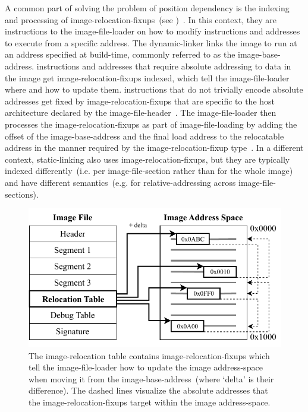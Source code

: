 A common part of solving the problem of position dependency is the indexing and processing of \glspl{image-relocation-fixup}~(see )~\cite{levine2000linkers}. In this context, they are instructions to the \gls{image-file-loader} on how to modify  instructions and addresses to execute from a specific address. The \gls{dynamic-linker} links the \gls{image} to run at an address specified at build-time, commonly referred to as the \gls{image-base-address}.  instructions and addresses that require absolute addressing to data in the \gls{image} get \glspl{image-relocation-fixup} indexed, which tell the \gls{image-file-loader} where and how to update them.  instructions that do not trivially encode absolute addresses get fixed by \glspl{image-relocation-fixup} that are specific to the host architecture declared by the \gls{image-file-header}~\cite{elf-spec,pe-format,arm64-elf}. The \gls{image-file-loader} then processes the \glspl{image-relocation-fixup} as part of \gls{image-file-loading} by adding the offset of the \gls{image-base-address} and the final load address to the relocatable address in the manner required by the \gls{image-relocation-fixup} type~\cite{levine2000linkers}. In a different context, \gls{static-linking} also uses \glspl{image-relocation-fixup}, but they are typically indexed differently~(i.e. per \gls{image-file-section} rather than for the whole \gls{image}) and have different semantics~(e.g. for \gls{relative-addressing} across \glspl{image-file-section}).

\begin{figure}[htb]
  \centering
  \includegraphics{Figures/RelocFixups.pdf}
  \caption{Image Relocation Fixups.}
  \label{fig:imgreloc}
  \caption*{The \gls{image-relocation} table contains \glspl{image-relocation-fixup} which tell the \gls{image-file-loader} how to update the \gls{image} \gls{address-space} when moving it from the \gls{image-base-address}~(where `delta' is their difference). The dashed lines visualize the absolute addresses that the \glspl{image-relocation-fixup} target within the \gls{image} \gls{address-space}.}
\end{figure}

